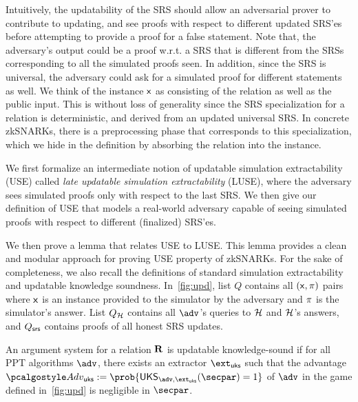 Intuitively, the updatability of the SRS should allow an adversarial prover to contribute to updating, and see proofs with respect to different updated SRS'es before attempting to provide a proof for a false statement. Note that, the adversary's output could be a proof w.r.t. a SRS that is different from the SRSs corresponding to all the simulated proofs seen. In addition, since the SRS is universal, the adversary could ask for a simulated proof for different statements as well. We think of the instance $\mathsf{x}$ as consisting of the relation as well as the public input. This is without loss of generality since the SRS specialization for a relation is deterministic, and derived from an updated universal SRS. In concrete zkSNARKs, there is a preprocessing phase that corresponds to this specialization, which we hide in the definition by absorbing the relation into the instance.

We first formalize an intermediate notion of updatable simulation extractability (USE) called \emph{late updatable simulation extractability} (LUSE), where the adversary sees simulated proofs only with respect to the last SRS. We then give our definition of USE that models a real-world adversary capable of seeing simulated proofs with respect to different (finalized) SRS'es.

We then prove a lemma that relates USE to LUSE. This lemma provides a clean and modular approach for proving USE property of zkSNARKs. 
For the sake of completeness, we also recall the definitions of standard simulation extractability and updatable knowledge soundness.
In~\cref{fig:upd}, list $Q$ contains all $(\mathsf{x}, \pi)$ pairs where
$\mathsf{x}$ is an instance provided to the simulator by the adversary and
$\pi$ is the simulator's answer. List $Q_{\mathcal{H}}$ contains all $\advse$'s
queries to $\mathcal{H}$ and $\mathcal{H}$'s answers, and $Q_{\mathsf{srs}}$ contains proofs of all honest SRS updates.



\begin{definition}\label{upd-KS}
	An argument system for a relation $\mathbf{R}$ is updatable knowledge-sound if for all PPT algorithms $\advse$, there exists an extractor $\ext_{\uks}$ such that the advantage $\Adv_{\uks} := \prob{\UKS_{\advse,\ext_{\uks}}(\secpar) = 1}$ of $\advse$ in the game defined in~\cref{fig:upd} is negligible in $\secpar$.
\end{definition}

